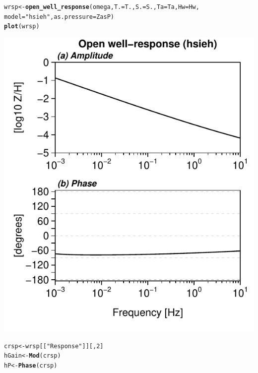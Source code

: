 \documentclass[12pt]{article}\usepackage[]{graphicx}\usepackage[]{color}
\makeatletter
\def\maxwidth{ %
  \ifdim\Gin@nat@width>\linewidth
    \linewidth
  \else
    \Gin@nat@width
  \fi
}
\newcommand{\hlnum}[1]{\textcolor[rgb]{0.686,0.059,0.569}{#1}}%
\newcommand{\hlstr}[1]{\textcolor[rgb]{0.192,0.494,0.8}{#1}}%
\newcommand{\hlstd}[1]{\textcolor[rgb]{0.345,0.345,0.345}{#1}}%
\newcommand{\hlkwb}[1]{\textcolor[rgb]{0.69,0.353,0.396}{#1}}%
\newcommand{\hlkwc}[1]{\textcolor[rgb]{0.333,0.667,0.333}{#1}}%
\newcommand{\hlkwd}[1]{\textcolor[rgb]{0.737,0.353,0.396}{\textbf{#1}}}%
\newenvironment{kframe}{%
 \def\at@end@of@kframe{}%
 \ifinner\ifhmode%
  \def\at@end@of@kframe{\end{minipage}}%
  \begin{minipage}{\columnwidth}%
 \fi\fi%
 \def\FrameCommand##1{\hskip\@totalleftmargin \hskip-\fboxsep
 \colorbox{shadecolor}{##1}\hskip-\fboxsep
     \hskip-\linewidth \hskip-\@totalleftmargin \hskip\columnwidth}%
 \MakeFramed {\advance\hsize-\width
   \@totalleftmargin\z@ \linewidth\hsize
   \@setminipage}}%
 {\par\unskip\endMakeFramed%
 \at@end@of@kframe}
\newenvironment{knitrout}{}{} %
\makeatother
\begin{document}
\begin{knitrout}\small
{}\color{fgcolor}\begin{kframe}
\begin{alltt}
\hlstd{wrsp} \hlkwb{<-} \hlkwd{open_well_response}\hlstd{(omega,} \hlkwc{T.} \hlstd{= T.,} \hlkwc{S.} \hlstd{= S.,} \hlkwc{Ta} \hlstd{= Ta,} \hlkwc{Hw} \hlstd{= Hw,}
    \hlkwc{model} \hlstd{=} \hlstr{"hsieh"}\hlstd{,} \hlkwc{as.pressure} \hlstd{= ZasP)}
\hlkwd{plot}\hlstd{(wrsp)}
\end{alltt}
\end{kframe}
\includegraphics[width=\maxwidth]{figure/HSIEHRESP} 
\begin{kframe}\begin{alltt}
\hlstd{crsp} \hlkwb{<-} \hlstd{wrsp[[}\hlstr{"Response"}\hlstd{]][,} \hlnum{2}\hlstd{]}
\hlstd{hGain} \hlkwb{<-} \hlkwd{Mod}\hlstd{(crsp)}
\hlstd{hP} \hlkwb{<-} \hlkwd{Phase}\hlstd{(crsp)}
\end{alltt}
\end{kframe}
\end{knitrout}
\end{document}
